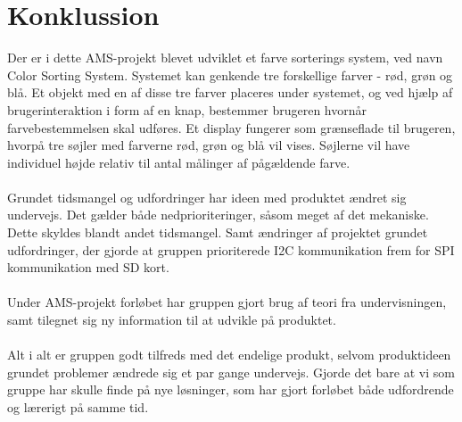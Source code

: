 \graphicspath{{Chapters/Konklussion/}}


\section{Konklussion}
Der er i dette AMS-projekt blevet udviklet et farve sorterings system, ved navn Color Sorting System. Systemet kan genkende tre forskellige farver - rød, grøn og blå. Et objekt med en af disse tre farver placeres under systemet, og ved hjælp af brugerinteraktion i form af en knap, bestemmer brugeren hvornår farvebestemmelsen skal udføres. Et display fungerer som grænseflade til brugeren, hvorpå tre søjler med farverne rød, grøn og blå vil vises. Søjlerne vil have individuel højde relativ til antal målinger af pågældende farve.  \\\\
Grundet tidsmangel og udfordringer har ideen med produktet ændret sig undervejs. Det gælder både nedprioriteringer, såsom meget af det mekaniske. Dette skyldes blandt andet tidsmangel. Samt ændringer af projektet grundet udfordringer, der gjorde at gruppen prioriterede I2C kommunikation frem for SPI kommunikation med SD kort. \\\\
Under AMS-projekt forløbet har gruppen gjort brug af teori fra undervisningen, samt tilegnet sig ny information til at udvikle på produktet. \\\\
Alt i alt er gruppen godt tilfreds med det endelige produkt, selvom produktideen grundet problemer ændrede sig et par gange undervejs. Gjorde det bare at vi som gruppe har skulle finde på nye løsninger, som har gjort forløbet både udfordrende og lærerigt på samme tid.
